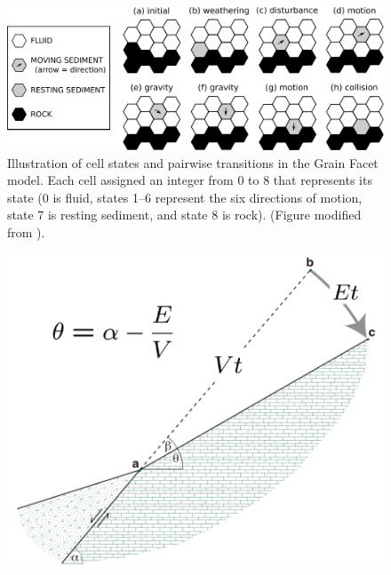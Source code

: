 \begin{figure}[ht!]
\centerline{\includegraphics[scale=0.7]{Figures/cell_states_and_transitions.pdf}}
\caption{Illustration of cell states and pairwise transitions in the Grain Facet model. Each cell assigned an integer from 0 to 8 that represents its state (0 is fluid, states 1--6 represent the six directions of motion, state 7 is resting sediment, and state 8 is rock). (Figure modified from \citet{tucker2018lattice}).}
\label{fig:cellstates}
\end{figure}

\begin{figure}[ht!]
\centerline{\includegraphics{Figures/facet_schematic.pdf}}
\caption{}
\label{fig:facetschem}
\end{figure}

